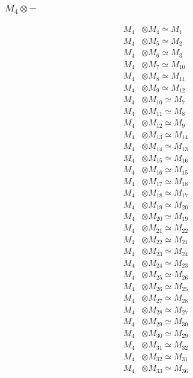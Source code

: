 \subsubsection{$ M_{4}\otimes -$}
\begin{align*}
M_{4} &\otimes M_{4} \simeq M_{1} \\
M_{4} &\otimes M_{5} \simeq M_{2} \\
M_{4} &\otimes M_{6} \simeq M_{3} \\
M_{4} &\otimes M_{7} \simeq M_{10} \\
M_{4} &\otimes M_{8} \simeq M_{11} \\
M_{4} &\otimes M_{9} \simeq M_{12} \\
M_{4} &\otimes M_{10} \simeq M_{7} \\
M_{4} &\otimes M_{11} \simeq M_{8} \\
M_{4} &\otimes M_{12} \simeq M_{9} \\
M_{4} &\otimes M_{13} \simeq M_{14} \\
M_{4} &\otimes M_{14} \simeq M_{13} \\
M_{4} &\otimes M_{15} \simeq M_{16} \\
M_{4} &\otimes M_{16} \simeq M_{15} \\
M_{4} &\otimes M_{17} \simeq M_{18} \\
M_{4} &\otimes M_{18} \simeq M_{17} \\
M_{4} &\otimes M_{19} \simeq M_{20} \\
M_{4} &\otimes M_{20} \simeq M_{19} \\
M_{4} &\otimes M_{21} \simeq M_{22} \\
M_{4} &\otimes M_{22} \simeq M_{21} \\
M_{4} &\otimes M_{23} \simeq M_{24} \\
M_{4} &\otimes M_{24} \simeq M_{23} \\
M_{4} &\otimes M_{25} \simeq M_{26} \\
M_{4} &\otimes M_{26} \simeq M_{25} \\
M_{4} &\otimes M_{27} \simeq M_{28} \\
M_{4} &\otimes M_{28} \simeq M_{27} \\
M_{4} &\otimes M_{29} \simeq M_{30} \\
M_{4} &\otimes M_{30} \simeq M_{29} \\
M_{4} &\otimes M_{31} \simeq M_{32} \\
M_{4} &\otimes M_{32} \simeq M_{31} \\
M_{4} &\otimes M_{33} \simeq M_{36} \\

\end{align*}
